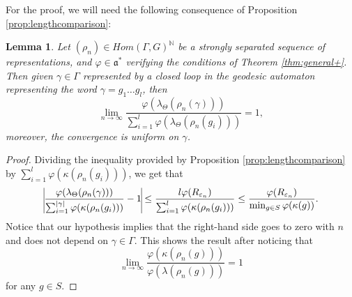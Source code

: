 \documentclass{amsart}
\newtheorem{lemma}[thm]{Lemma}
\theoremstyle{remark}
\theoremstyle{definition}
\begin{document}
For the proof, we will need the following consequence of Proposition \ref{prop:lengthcomparison}:

\begin{lemma}
   \label{lemma:lasdistancias}
 Let $(\rho_n) \in Hom (\Gamma,G)^\mathbb{N}$ be a strongly separated sequence of representations, and $\varphi \in \mathfrak{a}^*$ verifying the conditions of Theorem \ref{thm:general+}.
 Then given $\gamma \in \Gamma$ represented by a closed loop in the geodesic automaton representing the word $\gamma = g_1\ldots g_l$, then
   $$\lim_{n \to \infty} \frac{\varphi(\lambda_\Theta (\rho_n (\gamma)))}{\sum_{i=1}^l \varphi (\lambda_\Theta (\rho_n (g_i)))} =1,$$
 moreover, the convergence is uniform on $\gamma$.
\end{lemma}

\begin{proof}
 Dividing the inequality provided by Proposition \ref{prop:lengthcomparison} by $\sum_{i=1}^l \varphi (\kappa (\rho_n (g_i)))$, we get that      $$\vline \frac{\varphi (\lambda_\Theta (\rho_n (\gamma)))}{\sum_{i=1}^{|\gamma|} \varphi (\kappa (\rho_n (g_i)))} -1 \vline \leq \frac{l \varphi (R_{\varepsilon_n})}{\sum_{i=1}^l \varphi (\kappa (\rho_n (g_i)))} \leq \frac{\varphi (R_{\varepsilon_n})}{\min_{g \in S} \varphi (\kappa (g))}.$$
 Notice that our hypothesis implies that the right-hand side goes to zero with $n$ and does not depend on $\gamma \in \Gamma$. 
 This shows the result after noticing that $$\lim_{n \to \infty} \frac{\varphi (\kappa (\rho_n (g)))}{\varphi (\lambda (\rho_n (g)))} = 1$$ for any $g \in S$.
\end{proof}
\end{document}
